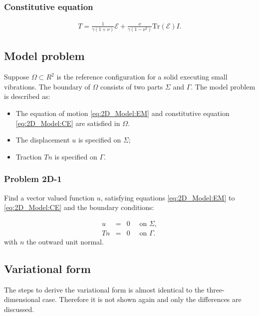 \documentclass[../../main.tex]{subfiles}
\begin{document}
\subsubsection{Constitutive equation}\label{sssec:2D_Model:ConstitutiveEquation}
\begin{eqnarray}
	T = \frac{1}{\gamma(1+\nu)}\mathcal{E} + \frac{\nu}{\gamma(1-\nu^2)}\textrm{Tr}(\mathcal{E}) I. \label{eq:2D_Model:CE}
\end{eqnarray}

\subsection{Model problem}\label{ssec:2D_Model:ModelProblem}
Suppose $\Omega \subset R^2$ is the reference configuration for a solid executing small vibrations. The boundary of $\Omega$ consists of two parts $\Sigma$ and $\Gamma$. The model problem is described as:
\begin{itemize}
    \item[] The equation of motion \eqref{eq:2D_Model:EM} and constitutive equation \eqref{eq:2D_Model:CE} are satisfied in $\Omega$.
	\item[] The displacement $u$ is specified on $\Sigma$;
	\item[] Traction $Tn$ is specified on $\Gamma$.
\end{itemize}

\subsubsection{Problem 2D-1}\label{sssec:2D_Model:Problem2D1}
Find a vector valued function $u$, satisfying equations \eqref{eq:2D_Model:EM} to \eqref{eq:2D_Model:CE} and the boundary conditions:

\begin{eqnarray*}
	u & = & 0 \quad \textrm{ on } \Sigma,\\
	Tn & = & 0 \quad \textrm{ on } \Gamma.
\end{eqnarray*} with $n$ the outward unit normal.

\subsection{Variational form}\label{ssec:2D_Model:VariationalForm}
The steps to derive the variational form is almost identical to the three-dimensional case. Therefore it is not shown again and only the differences are discussed. \\
\end{document}
